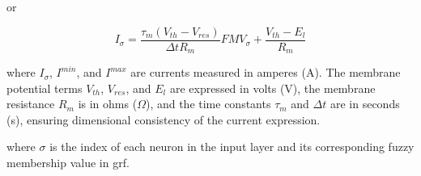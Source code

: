 \noindent or

\begin{equation} \label{Eq.25-1}
    I_{\sigma} = \frac{\tau_{m}\left(V_{th} - V_{res}\right)}{\Delta t R_{m}}FMV_{\sigma}+\frac{V_{th} - E_{l}}{R_{m}}
\end{equation}

\noindent
where \(I_{\sigma}\), \(I^{min}\), and \(I^{max}\) are currents measured in amperes (A). The membrane potential terms \(V_{th}\), \(V_{res}\), and \(E_l\) are expressed in volts (V), the membrane resistance \(R_m\) is in ohms (\(\Omega\)), and the time constants \(\tau_m\) and \(\Delta t\) are in seconds (s), ensuring dimensional consistency of the current expression.


\noindent where $\sigma$ is the index of each neuron in the input layer and its corresponding fuzzy membership value in \ac{grf}.

